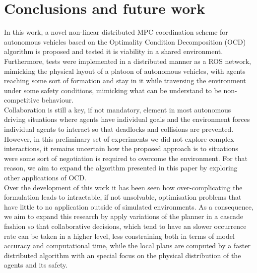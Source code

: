 \documentclass[letterpaper, 10 pt, conference]{ieeeconf}  %
\begin{document}
\section{Conclusions and future work}
\label{sec:conclusions} 

In this work, a novel non-linear distributed MPC coordination scheme for autonomous vehicles based on the Optimality Condition Decomposition (OCD) algorithm is proposed and tested it is viability in a shared environment. Furthermore, tests were implemented in a distributed manner as a ROS network, mimicking the physical layout of a platoon of autonomous vehicles, with agents reaching some sort of formation and stay in it while traversing the environment under some safety conditions, mimicking what can be understand to be non-competitive behaviour.\\  

Collaboration is still a key, if not mandatory, element in most autonomous driving situations where agents have individual goals and the environment forces individual agents to interact so that deadlocks and collisions are prevented. However, in this preliminary set of experiments we did not explore complex interactions, it remains uncertain how the proposed approach is to situations were some sort of negotiation is required to overcome the environment. For that reason, we aim to expand the algorithm presented in this paper by exploring other applications of OCD.\\

Over the development of this work it has been seen how over-complicating the formulation leads to intractable, if not unsolvable, optimisation problems that have little to no application outside of simulated environments. As a consequence, we aim to expand this research by apply variations of the planner in a cascade fashion so that collaborative decisions, which tend to have an slower occurrence rate can be taken in a higher level, less constraining both in terms of model accuracy and computational time, while the local plans are computed by a faster distributed algorithm with an special focus on the physical distribution of the agents and its safety.


\end{document}
